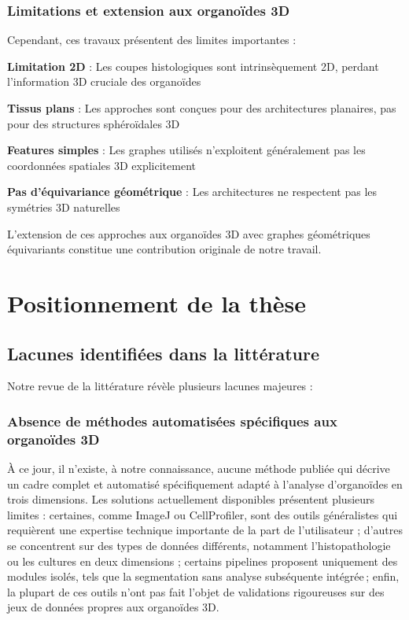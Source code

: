\subsubsection{Limitations et extension aux organoïdes 3D}

Cependant, ces travaux présentent des limites importantes :

\textbf{Limitation 2D} : Les coupes histologiques sont intrinsèquement 2D, perdant l'information 3D cruciale des organoïdes

\textbf{Tissus plans} : Les approches sont conçues pour des architectures planaires, pas pour des structures sphéroïdales 3D

\textbf{Features simples} : Les graphes utilisés n'exploitent généralement pas les coordonnées spatiales 3D explicitement

\textbf{Pas d'équivariance géométrique} : Les architectures ne respectent pas les symétries 3D naturelles

L'extension de ces approches aux organoïdes 3D avec graphes géométriques équivariants constitue une contribution originale de notre travail.

\section{Positionnement de la thèse}

\subsection{Lacunes identifiées dans la littérature}

Notre revue de la littérature révèle plusieurs lacunes majeures :

\subsubsection{Absence de méthodes automatisées spécifiques aux organoïdes 3D}

À ce jour, il n’existe, à notre connaissance, aucune méthode publiée qui décrive un cadre complet et automatisé spécifiquement adapté à l’analyse d’organoïdes en trois dimensions. Les solutions actuellement disponibles présentent plusieurs limites : certaines, comme ImageJ ou CellProfiler, sont des outils généralistes qui requièrent une expertise technique importante de la part de l'utilisateur ; d’autres se concentrent sur des types de données différents, notamment l’histopathologie ou les cultures en deux dimensions ; certains pipelines proposent uniquement des modules isolés, tels que la segmentation sans analyse subséquente intégrée ; enfin, la plupart de ces outils n’ont pas fait l’objet de validations rigoureuses sur des jeux de données propres aux organoïdes 3D.

